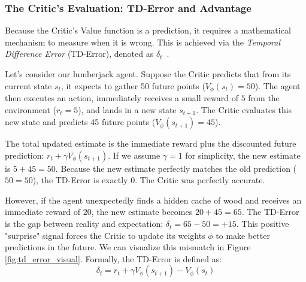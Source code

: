 \subsubsection{The Critic's Evaluation: TD-Error and Advantage}
\label{subsec:td_error}

Because the Critic's Value function is a prediction, it requires a mathematical mechanism to measure when it is wrong. This is achieved via the \emph{Temporal Difference Error} (TD-Error), denoted as $\delta_t$~\parencite{Sutton_Barto_2018}.

Let's consider our lumberjack agent. Suppose the Critic predicts that from its current state $s_t$, it expects to gather 50 future points ($V_\phi(s_t) = 50$). The agent then executes an action, immediately receives a small reward of $5$ from the environment ($r_t = 5$), and lands in a new state $s_{t+1}$. The Critic evaluates this new state and predicts 45 future points ($V_\phi(s_{t+1}) = 45$).

The total updated estimate is the immediate reward plus the discounted future prediction: $r_t + \gamma V_\phi(s_{t+1})$. If we assume $\gamma=1$ for simplicity, the new estimate is $5 + 45 = 50$. Because the new estimate perfectly matches the old prediction ($50 = 50$), the TD-Error is exactly 0. The Critic was perfectly accurate.

However, if the agent unexpectedly finds a hidden cache of wood and receives an immediate reward of $20$, the new estimate becomes $20 + 45 = 65$. The TD-Error is the gap between reality and expectation: $\delta_t = 65 - 50 = +15$. This positive "surprise" signal forces the Critic to update its weights $\phi$ to make better predictions in the future. We can visualize this mismatch in Figure \ref{fig:td_error_visual}. Formally, the TD-Error is defined as:
\begin{equation}
\label{eq:td_error}
    \delta_t = r_t + \gamma V_\phi(s_{t+1}) - V_\phi(s_t)
\end{equation}

